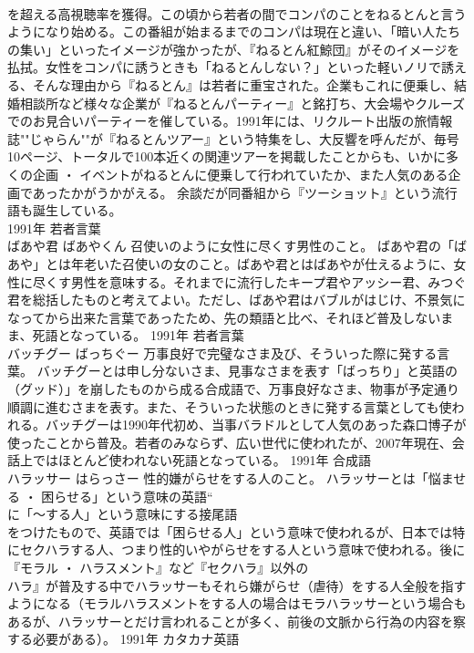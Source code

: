 \documentclass[8pt]{extreport}
\begin{document}
\begin{CJK}{UTF8}{min}
\\	を超える高視聴率を獲得。この頃から若者の間でコンパのことをねるとんと言うようになり始める。この番組が始まるまでのコンパは現在と違い、「暗い人たちの集い」といったイメージが強かったが、『ねるとん紅鯨団』がそのイメージを払拭。女性をコンパに誘うときも「ねるとんしない？」といった軽いノリで誘える、そんな理由から『ねるとん』は若者に重宝された。企業もこれに便乗し、結婚相談所など様々な企業が『ねるとんパーティー』と銘打ち、大会場やクルーズでのお見合いパーティーを催している。1991年には、リクルート出版の旅情報誌""じゃらん""が『ねるとんツアー』という特集をし、大反響を呼んだが、毎号10ページ、トータルで100本近くの関連ツアーを掲載したことからも、いかに多くの企画 ・ イベントがねるとんに便乗して行われていたか、また人気のある企画であったかがうかがえる。 余談だが同番組から『ツーショット』という流行語も誕生している。
\\	1991年	若者言葉	
\\	ばあや君	ばあやくん	召使いのように女性に尽くす男性のこと。	ばあや君の「ばあや」とは年老いた召使いの女のこと。ばあや君とはばあやが仕えるように、女性に尽くす男性を意味する。それまでに流行したキープ君やアッシー君、みつぐ君を総括したものと考えてよい。ただし、ばあや君はバブルがはじけ、不景気になってから出来た言葉であったため、先の類語と比べ、それほど普及しないまま、死語となっている。	1991年	若者言葉	
\\	バッチグー	ばっちぐー	万事良好で完璧なさま及び、そういった際に発する言葉。	バッチグーとは申し分ないさま、見事なさまを表す「ばっちり」と英語の
\\	（グッド）」を崩したものから成る合成語で、万事良好なさま、物事が予定通り順調に進むさまを表す。また、そういった状態のときに発する言葉としても使われる。バッチグーは1990年代初め、当事バラドルとして人気のあった森口博子が使ったことから普及。若者のみならず、広い世代に使われたが、2007年現在、会話上ではほとんど使われない死語となっている。	1991年	合成語	
\\	ハラッサー	はらっさー	性的嫌がらせをする人のこと。	ハラッサーとは「悩ませる ・ 困らせる」という意味の英語“
\\	に「～する人」という意味にする接尾語
\\	をつけたもので、英語では「困らせる人」という意味で使われるが、日本では特にセクハラする人、つまり性的いやがらせをする人という意味で使われる。後に『モラル ・ ハラスメント』など『セクハラ』以外の
\\	ハラ』が普及する中でハラッサーもそれら嫌がらせ（虐待）をする人全般を指すようになる（モラルハラスメントをする人の場合はモラハラッサーという場合もあるが、ハラッサーとだけ言われることが多く、前後の文脈から行為の内容を察する必要がある）。	1991年	カタカナ英語	

\end{CJK}
\end{document}
